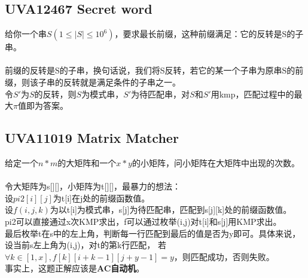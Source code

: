     \subsection{UVA12467 Secret word}
        给你一个串$S(1 \le |S| \le 10^6)$，要求最长前缀，这种前缀满足：它的反转是S的子串。\\\\
        前缀的反转是S的子串，换句话说，我们将S反转，若它的某一个子串为原串S的前缀，则该子串的反转就是满足条件的子串之一。\\
        令$S'$为$S$的反转，则$S$为模式串，$S'$为待匹配串，对$S$和$S'$用kmp，匹配过程中的最大$\pi$值即为答案。
    \subsection{UVA11019 Matrix Matcher}
        给定一个$n*m$的大矩阵和一个$x*y$的小矩阵，问小矩阵在大矩阵中出现的次数。\\\\
        令大矩阵为s[][]，小矩阵为t[][]，最暴力的想法：\\
        设$pi2[i][j]$为t[i]在j处的前缀函数值。\\
        设$f(i,j,k)$为以t[i]为模式串，s[j]为待匹配串，匹配到s[j][k]处的前缀函数值。\\
        pi2可以直接通过x次KMP求出，f可以通过枚举(i,j)对t[i]和s[j]用KMP求出。\\
        最后枚举t在s中的左上角，判断每一行匹配到最后的值是否为y即可。具体来说，设当前s左上角为(i,j)，对t的第k行匹配，
        若$\forall k \in [1,x], f[k][i + k - 1][j + y - 1] = y$，则匹配成功，否则失败。\\
        事实上，这题正解应该是\textbf{AC自动机}。